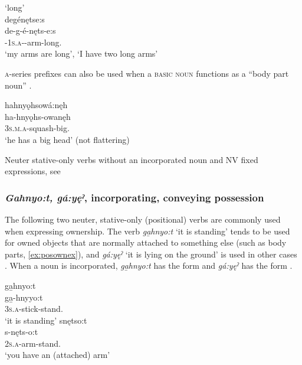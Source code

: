 \ea\label{ex:adjvbppchoicex110}  ‘long’\\
degénętse:s \\
\gll de-g-é-nęts-e:s\\
 {\dualic}-\textsc{1s.a}-{\joinerE}-arm-long.{\stative}\\
\glt ‘my arms are long’, `I have two long arms'
\z


\textsc{a}-series prefixes can also be used when a \textsc{basic noun} functions as a “body part noun” .

\newpage
\ea\label{ex:adjvbppchoicex111} 
hahnyǫhsowá:nęh\\
\gll ha-hnyǫhs-owanęh\\
\textsc{3s.m.a}-squash-big.{\stative}\\
\glt ‘he has a big head’ (not flattering)

\z


Neuter stative-only verbs without an incorporated noun and NV fixed expressions, see 

\subsubsection{\textit{Gahnyo:t, gá:yęˀ}, incorporating, conveying possession} \label{Gahnyo:t, gá:yęˀ, incorporating, conveying possession}
The following two neuter, stative-only (positional) verbs are commonly used when expressing ownership. The verb \textit{ga̱hnyo:t} ‘it is standing’ tends to be used for owned objects that are normally attached to something else (such as body parts, \ref{ex:posownex}), and \textit{gá:yęˀ} ‘it is lying on the ground’ is used in other cases . When a noun is incorporated, \textit{ga̱hnyo:t} has the form  and \textit{gá:yęˀ} has the form \linebreak {}.

\ea\label{ex:posownex} 
\ea ga̱hnyo:t\\
\gll ga̱-hnyyo:t\\
\textsc{3s.a}-stick-stand.{\stative}\\
\glt ‘it is standing’
\ex snętso:t\\
\gll s-nęts-o:t\\
 \textsc{2s.a}-arm-stand.{\stative}\\
\glt `you have an (attached) arm'
\z
\z

